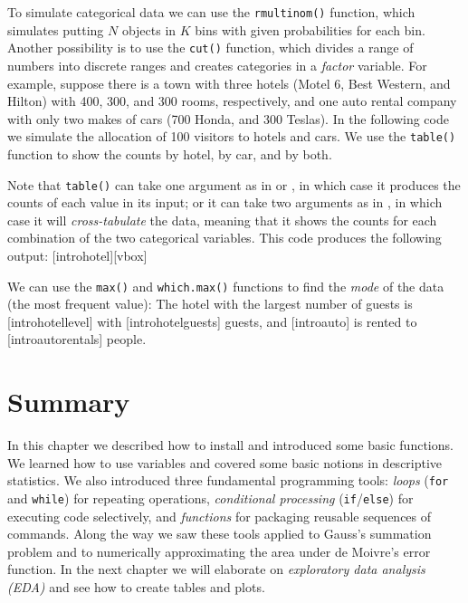 To simulate categorical data we can use the \lstinline{rmultinom()} function,
which simulates putting $N$ objects in $K$ bins with given probabilities for
each bin. 
Another possibility is to use the \lstinline{cut()} function, 
which divides a range of numbers into discrete ranges and creates categories
in a \emph{factor} variable.
For example, suppose there is a town with three hotels (Motel 6, Best Western,
and Hilton) with 400, 300, and 300 rooms, respectively, and one auto rental
company with only two makes of cars (700 Honda, and 300 Teslas). In the
following code we simulate the allocation of 100 visitors to hotels and cars.
We use the \lstinline{table()} function to show the counts by hotel, by car,
and by both.


Note that \lstinline{table()} can take one argument as in
 or , in which case it produces the counts of
each value in its input; or it can take two arguments as in ,
in which case it will \emph{cross-tabulate} the data, meaning that it
shows the counts for each combination of the two categorical variables.
This code produces the following output:
[introhotel][vbox]


We can use the \lstinline{max()} and \lstinline{which.max()} functions
to find the \emph{mode} of the data (the most frequent value):
The hotel with the largest number of guests is
[introhotellevel] with
[introhotelguests] guests, and
[introauto]
is rented to [introautorentals] people.

\section{Summary}
In this chapter we described how to install \R and introduced some
basic functions. We learned how to use variables and covered some
basic notions in descriptive statistics. We also introduced three
fundamental programming tools: \emph{loops} (\lstinline{for} and
\lstinline{while}) for repeating operations, \emph{conditional
processing} (\lstinline{if}/\lstinline{else}) for executing code
selectively, and \emph{functions} for packaging reusable sequences
of commands. Along the way we saw these tools applied to Gauss's
summation problem and to numerically approximating the area under
de Moivre's error function. In the next chapter we will elaborate
on \emph{exploratory data analysis (EDA)} and see how to create
tables and plots.

